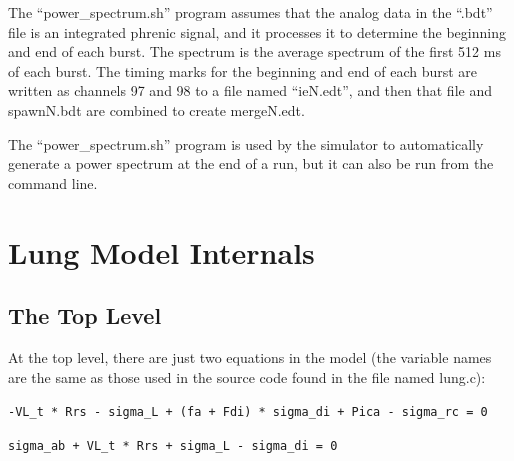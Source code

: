 \documentclass[12pt,openany,oneside]{book}
\newcommand{\ticode}[1]{\texttt{#1}}
\begin{document}
The ``power\_spectrum.sh'' program assumes that the analog data in the
``.bdt'' file is an integrated phrenic signal, and it processes it to
determine the beginning and end of each burst.  The spectrum is the
average spectrum of the first 512 ms of each burst.  The timing marks
for the beginning and end of each burst are written as channels 97 and
98 to a file named ``ieN.edt'', and then that file and spawnN.bdt are
combined to create mergeN.edt.

The ``power\_spectrum.sh'' program is used by the simulator to
automatically generate a power spectrum at the end of a run, but it
can also be run from the command line.

\chapter{Lung Model Internals}

\section{The Top Level}
\enlargethispage*{12pt}
At the top level, there are just two equations in the model (the
variable names are the same as those used in the source code found in
the file named lung.c):

\hspace{3pc}\ticode{-VL\_t * Rrs - sigma\_L + (fa + Fdi) * sigma\_di + Pica - sigma\_rc = 0}

\hspace{3pc}\ticode{sigma\_ab + VL\_t * Rrs + sigma\_L - sigma\_di = 0}
\end{document}
